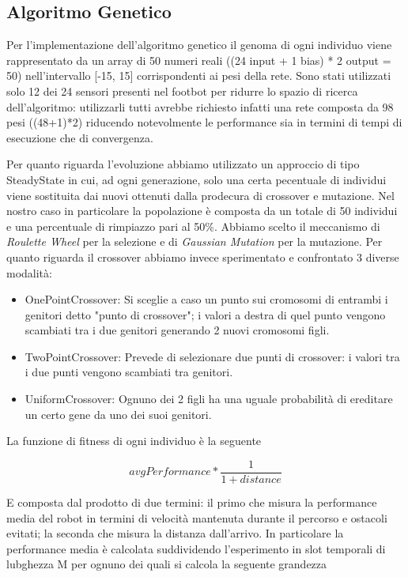 \documentclass[]{report}
\begin{document}
\subsection{Algoritmo Genetico}
Per l'implementazione dell'algoritmo genetico il genoma di ogni individuo viene rappresentato da un array di 50 numeri reali ((24 input + 1 bias) * 2  output = 50) nell'intervallo [-15, 15] corrispondenti ai pesi della rete. Sono stati utilizzati solo 12 dei 24 sensori presenti nel footbot per ridurre lo spazio di ricerca dell'algoritmo: utilizzarli tutti avrebbe richiesto infatti una rete composta da 98 pesi ((48+1)*2) riducendo notevolmente le performance sia in termini di tempi di esecuzione che di convergenza.

Per quanto riguarda l'evoluzione abbiamo utilizzato un approccio di tipo SteadyState in cui, ad ogni generazione, solo una certa pecentuale di individui viene sostituita dai nuovi ottenuti dalla prodecura di crossover e mutazione. Nel nostro caso in particolare la popolazione è composta da un totale di 50 individui e una percentuale di rimpiazzo pari al 50\%.  Abbiamo scelto il meccanismo di \textit{Roulette Wheel} per la selezione e di \textit{Gaussian Mutation} per la mutazione.
Per quanto riguarda il crossover abbiamo invece sperimentato e confrontato 3 diverse modalità: 
\begin{itemize}
\item{OnePointCrossover}: Si sceglie a caso un punto sui cromosomi di entrambi i genitori detto "punto di crossover"; i valori a destra di quel punto vengono scambiati tra i due genitori generando 2 nuovi cromosomi figli.
\item{TwoPointCrossover}: Prevede di selezionare due punti di crossover: i valori tra i due punti vengono scambiati tra genitori.
\item{UniformCrossover}: Ognuno dei 2 figli ha una uguale probabilità di ereditare un certo gene da uno dei suoi genitori.
 \end{itemize}

La funzione di fitness di ogni individuo è la seguente

\[avgPerformance * \dfrac{1}{1+distance}\]

E composta dal prodotto di due termini: il primo che misura la performance media del robot in termini di velocità mantenuta durante il percorso e ostacoli evitati; la seconda che misura la distanza dall'arrivo. In particolare la performance media è calcolata suddividendo l'esperimento in slot temporali di lubghezza M per ognuno dei quali si calcola la seguente grandezza
\end{document}
